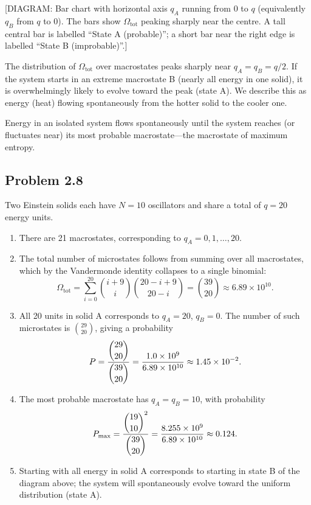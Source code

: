 \begin{center}
[DIAGRAM: Bar chart with horizontal axis $q_A$ running from $0$ to $q$ (equivalently
$q_B$ from $q$ to $0$).  The bars show $\Omega_{\text{tot}}$ peaking sharply near the
centre.  A tall central bar is labelled ``State A (probable)''; a short bar near the
right edge is labelled ``State B (improbable)''.]
\end{center}

The distribution of $\Omega_{\text{tot}}$ over macrostates peaks sharply near $q_A =
q_B = q/2$.  If the system starts in an extreme macrostate B (nearly all energy in one
solid), it is overwhelmingly likely to evolve toward the peak (state A).  We describe
this as energy (heat) flowing spontaneously from the hotter solid to the cooler one.

\begin{definition}
Energy in an isolated system flows spontaneously until the system reaches (or fluctuates
near) its most probable macrostate---the macrostate of maximum entropy.
\end{definition}

\subsection*{Problem 2.8}

Two Einstein solids each have $N = 10$ oscillators and share a total of $q = 20$ energy
units.

\begin{enumerate}[label=\alph*)]
  \item There are 21 macrostates, corresponding to $q_A = 0, 1, \ldots, 20$.

  \item The total number of microstates follows from summing over all macrostates, which
    by the Vandermonde identity collapses to a single binomial:
    \[
      \Omega_{\text{tot}}
      = \sum_{i=0}^{20} \binom{i+9}{i}\binom{20-i+9}{20-i}
      = \binom{39}{20} \approx 6.89\times10^{10}.
    \]

  \item All 20 units in solid A corresponds to $q_A = 20$, $q_B = 0$.  The number of
    such microstates is $\binom{29}{20}$, giving a probability
    \[
      P = \frac{\dbinom{29}{20}}{\dbinom{39}{20}}
        = \frac{1.0\times10^9}{6.89\times10^{10}}
        \approx 1.45\times10^{-2}.
    \]

  \item The most probable macrostate has $q_A = q_B = 10$, with probability
    \[
      P_{\max}
      = \frac{\dbinom{19}{10}^2}{\dbinom{39}{20}}
      = \frac{8.255\times10^9}{6.89\times10^{10}}
      \approx 0.124.
    \]

  \item Starting with all energy in solid A corresponds to starting in state B of the
    diagram above; the system will spontaneously evolve toward the uniform distribution
    (state A).
\end{enumerate}

